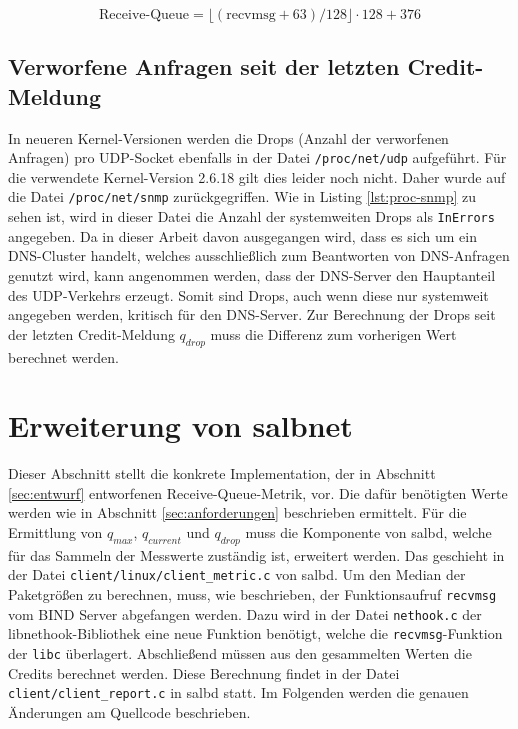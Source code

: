 \documentclass[a4paper, 12pt, BCOR10mm, DIV12, toc=bibliography, toc=listof, german]{scrbook}
\begin{document}
		\begin{equation}
			\text{Receive-Queue} = \lfloor (\text{recvmsg} + 63) / 128 \rfloor \cdot 128 + 376
			\label{eq:recvmsg}
		\end{equation}



		\subsection*{Verworfene Anfragen seit der letzten Credit-Meldung} %

		In neueren Kernel-Versionen werden die Drops (Anzahl der verworfenen Anfragen) pro UDP-Socket
		ebenfalls in der Datei \texttt{/proc/net/udp} aufgeführt. Für die verwendete Kernel-Version
		2.6.18 gilt dies leider noch nicht. Daher wurde auf die Datei \texttt{/proc/net/snmp}
		zurückgegriffen. Wie in Listing \ref{lst:proc-snmp} zu sehen ist, wird in dieser Datei die Anzahl
		der systemweiten Drops als \texttt{InErrors} angegeben. Da in dieser Arbeit davon ausgegangen
		wird, dass es sich um ein DNS-Cluster handelt, welches ausschließlich zum Beantworten von
		DNS-Anfragen genutzt wird, kann angenommen werden, dass der DNS-Server den Hauptanteil
		des UDP-Verkehrs erzeugt. Somit sind Drops, auch wenn diese nur systemweit angegeben werden,
		kritisch für den DNS-Server. Zur Berechnung der Drops seit der letzten Credit-Meldung $q_{drop}$
		muss die Differenz zum vorherigen Wert berechnet werden.
		
		




		\section{Erweiterung von salbnet} %
		\label{sec:erweiterung}

		Dieser Abschnitt stellt die konkrete Implementation, der in Abschnitt \ref{sec:entwurf}
		entworfenen Receive-Queue-Metrik, vor. Die dafür benötigten Werte werden wie in Abschnitt
		\ref{sec:anforderungen} beschrieben ermittelt. Für die Ermittlung von $q_{max}$, $q_{current}$
		und $q_{drop}$ muss die Komponente von salbd, welche für das Sammeln der Messwerte zuständig
		ist, erweitert werden. Das geschieht in der Datei \texttt{client/linux/client\_metric.c} von
		salbd.  Um den Median der Paketgrößen zu berechnen, muss, wie beschrieben, der Funktionsaufruf
		\texttt{recvmsg} vom BIND Server abgefangen werden. Dazu wird in der Datei \texttt{nethook.c}
		der libnethook-Bibliothek eine neue Funktion benötigt, welche die \texttt{recvmsg}-Funktion der
		\texttt{libc} überlagert. Abschließend müssen aus den gesammelten Werten die Credits berechnet
		werden. Diese Berechnung findet in der Datei \texttt{client/client\_report.c} in salbd statt. Im
		Folgenden werden die genauen Änderungen am Quellcode beschrieben.
\end{document}
